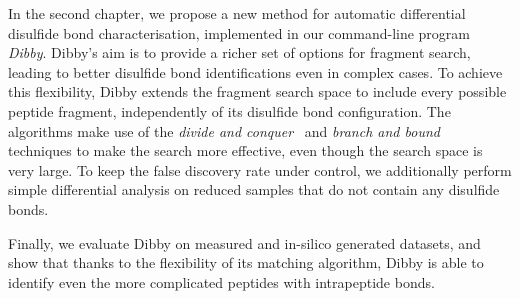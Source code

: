 In the second chapter, we propose a new method for automatic differential disulfide bond characterisation, implemented in our command-line program \emph{Dibby}. Dibby's aim is to provide a richer set of options for fragment search, leading to better disulfide bond identifications even in complex cases. To achieve this flexibility, Dibby extends the fragment search space to include every possible peptide fragment, independently of its disulfide bond configuration. The algorithms make use of the \emph{divide and conquer}~\cite{smith1985design} and \emph{branch and bound}~\cite{boyd2007branch} techniques to make the search more effective, even though the search space is very large. To keep the false discovery rate under control, we additionally perform simple differential analysis on reduced samples that do not contain any disulfide bonds.

Finally, we evaluate Dibby on measured and in-silico generated datasets, and show that thanks to the flexibility of its matching algorithm, Dibby is able to identify even the more complicated peptides with intrapeptide bonds.
